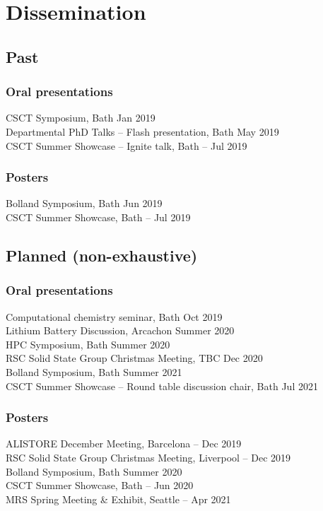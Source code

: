 \vspace{-6cm}
\thispagestyle{plain}
\section*{Dissemination}
\subsection*{Past}
\subsubsection*{Oral presentations}
CSCT Symposium, Bath \dotfill {} Jan 2019\\
Departmental PhD Talks -- Flash presentation, Bath \dotfill {} May 2019\\
CSCT Summer Showcase -- Ignite talk, Bath \dotfill {}-- Jul 2019
\subsubsection*{Posters}
Bolland Symposium, Bath \dotfill {} Jun 2019\\
CSCT Summer Showcase, Bath \dotfill {}-- Jul 2019
\subsection*{Planned (non-exhaustive)}
\subsubsection*{Oral presentations}
Computational chemistry seminar, Bath \dotfill {} Oct 2019\\
Lithium Battery Discussion, Arcachon \dotfill Summer 2020\\
HPC Symposium, Bath \dotfill Summer 2020\\
RSC Solid State Group Christmas Meeting, TBC \dotfill Dec 2020\\
Bolland Symposium, Bath \dotfill Summer 2021\\
CSCT Summer Showcase -- Round table discussion chair, Bath \dotfill Jul 2021
\subsubsection*{Posters}
ALISTORE December Meeting, Barcelona \dotfill {}-- Dec 2019\\
RSC Solid State Group Christmas Meeting, Liverpool \dotfill {}-- Dec 2019\\
Bolland Symposium, Bath \dotfill Summer 2020\\
CSCT Summer Showcase, Bath \dotfill {}-- Jun 2020\\
MRS Spring Meeting \& Exhibit, Seattle \dotfill {}-- Apr 2021\\
